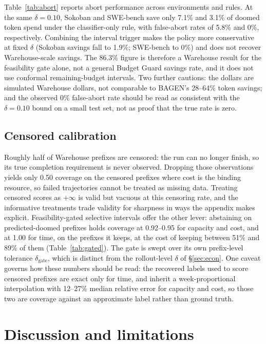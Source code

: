 \documentclass{article}
\begin{document}
Table~\ref{tab:abort} reports abort performance across environments and rules. At the same $\delta{=}0.10$, Sokoban and SWE-bench save only 7.1\% and 3.1\% of doomed token spend under the classifier-only rule, with false-abort rates of 5.8\% and 0\%, respectively. Combining the interval trigger makes the policy more conservative at fixed $\delta$ (Sokoban savings fall to 1.9\%; SWE-bench to 0\%) and does not recover Warehouse-scale savings. The 86.3\% figure is therefore a Warehouse result for the feasibility gate alone, not a general Budget Guard savings rate, and it does not use conformal remaining-budget intervals. Two further cautions: the dollars are simulated Warehouse dollars, not comparable to BAGEN's 28--64\% token savings; and the observed 0\% false-abort rate should be read as consistent with the $\delta{=}0.10$ bound on a small test set, not as proof that the true rate is zero.

\subsection{Censored calibration}
\label{sec:censored}

Roughly half of Warehouse prefixes are censored: the run can no longer finish, so its true completion requirement is never observed. Dropping those observations yields only 0.50 coverage on the censored prefixes where cost is the binding resource, so failed trajectories cannot be treated as missing data. Treating censored scores as $+\infty$ is valid but vacuous at this censoring rate, and the informative treatments trade validity for sharpness in ways the appendix makes explicit. Feasibility-gated selective intervals offer the other lever: abstaining on predicted-doomed prefixes holds coverage at 0.92--0.95 for capacity and cost, and at 1.00 for time, on the prefixes it keeps, at the cost of keeping between 51\% and 89\% of them (Table~\ref{tab:gated}). The gate is swept over its own prefix-level tolerance $\delta_{\mathrm{gate}}$, which is distinct from the rollout-level $\delta$ of \S\ref{sec:econ}. One caveat governs how these numbers should be read: the recovered labels used to score censored prefixes are exact only for time, and inherit a week-proportional interpolation with 12--27\% median relative error for capacity and cost, so those two are coverage against an approximate label rather than ground truth.

\flushbottom
\section{Discussion and limitations}
\label{sec:discussion}
\end{document}
